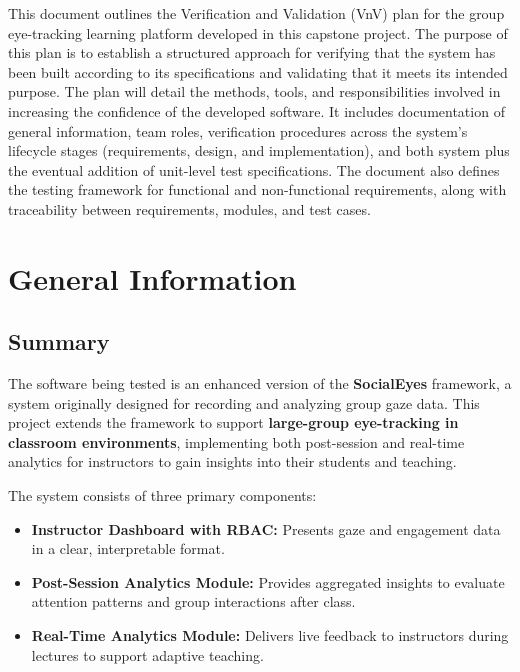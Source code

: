 \documentclass[12pt, titlepage]{article}
\begin{document}
\newpage


This document outlines the Verification and Validation (VnV) plan for the group eye-tracking learning platform developed in this capstone project. The purpose of this plan is to establish a structured approach for verifying that the system has been built according to its specifications and validating that it meets its intended purpose.
The plan will detail the methods, tools, and responsibilities involved in increasing the confidence of the developed software. It includes documentation of general information, team roles, verification procedures across the system’s lifecycle stages (requirements, design, and implementation), and both system plus the eventual addition of unit-level test specifications. The document also defines the testing framework for functional and non-functional requirements, along with traceability between requirements, modules, and test cases.



\section{General Information}

\subsection{Summary}

The software being tested is an enhanced version of the \textbf{SocialEyes} framework, a system originally designed for recording and analyzing group gaze data. This project extends the framework to support \textbf{large-group eye-tracking in classroom environments}, implementing both post-session and real-time analytics for instructors to gain insights into their students and teaching.

The system consists of three primary components:

\begin{itemize}
    \item \textbf{Instructor Dashboard with RBAC:} Presents gaze and engagement data in a clear, interpretable format.
    \item \textbf{Post-Session Analytics Module:} Provides aggregated insights to evaluate attention patterns and group interactions after class.
    \item \textbf{Real-Time Analytics Module:} Delivers live feedback to instructors during lectures to support adaptive teaching.
\end{itemize}
\end{document}

